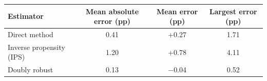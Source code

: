 \begin{tabular}{lccc}
\toprule
Estimator & Mean absolute error (pp) & Mean error (pp) & Largest error (pp) \\
\midrule
Direct method & 0.41 & +0.27 & 1.71 \\
Inverse propensity (IPS) & 1.20 & +0.78 & 4.11 \\
Doubly robust & 0.13 & $-$0.04 & 0.52 \\
\bottomrule
\end{tabular}
